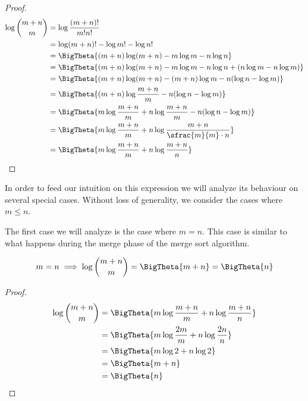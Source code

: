 \begin{proof}
\begin{align*}
\log\binom{m+n}{m} &= \log\frac{(m+n)!}{m!n!}\\
&= \log(m+n)! - \log m! - \log n!\\
&= \BigTheta{(m+n) \log(m+n) - m \log m - n \log n}\\
&= \BigTheta{(m+n) \log(m+n) - m \log m - n \log n + (n \log m - n \log m)}\\
&= \BigTheta{(m+n) \log(m+n) - (m+n) \log m - n (\log n - \log m)}\\
&= \BigTheta{(m+n) \log\frac{m+n}{m} - n (\log n - \log m)}\\
&= \BigTheta{m \log\frac{m+n}{m} + n \log\frac{m+n}{m} - n (\log n - \log m)}\\
&= \BigTheta{m \log\frac{m+n}{m} + n \log\frac{m+n}{\sfrac{m}{m} \cdot n}}\\
&= \BigTheta{m \log\frac{m+n}{m} + n \log\frac{m+n}{n}}\\
\end{align*}
\end{proof}

In order to feed our intuition on this expression we will analyze its behaviour
on several special cases. Without loss of generality, we consider the cases
where \(m \leq n\).

The first case we will analyze is the case where $m = n$. This case is similar
to what happens during the merge phase of the merge sort algorithm.

\begin{lemma}
\begin{align*}
m = n &\implies \log\binom{m+n}{m} = \BigTheta{m + n} = \BigTheta{n}\\
\end{align*}
\end{lemma}

\begin{proof}
\begin{align*}
\log\binom{m+n}{m} &= \BigTheta{m \log\frac{m+n}{m} + n \log\frac{m+n}{n}}\\
&= \BigTheta{m \log\frac{2m}{m} + n \log\frac{2n}{n}}\\
&= \BigTheta{m \log 2 + n \log 2}\\
&= \BigTheta{m + n}\\
&= \BigTheta{n}\\
\end{align*}
\end{proof}

